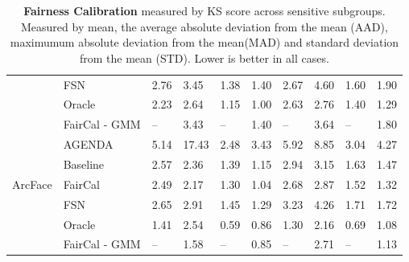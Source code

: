 \begin{table}
\begin{tabular}{l l ll ll ll ll}
& FSN          &    2.76 &   3.45  &    1.38 &  1.40  &    2.67 &   4.60  &    1.60 &  1.90  \\
& Oracle       &    2.23 &   2.64  &    1.15 &  1.00  &    2.63 &   2.76  &    1.40 &  1.29  \\
& FairCal - GMM &     -- &  3.43  &     -- &  1.40  &     -- &  3.64  &     -- &  1.80  \\
\hline
\multirow{5}{5em}{ArcFace} 
& AGENDA       &    5.14 &  17.43  &    2.48 &  3.43  &    5.92 &  8.85  &    3.04 &  4.27  \\
& Baseline     &    2.57 &   2.36  &    1.39 &  1.15  &    2.94 &  3.15  &    1.63 &  1.47  \\
& FairCal      &    2.49 &   2.17  &    1.30 &  1.04  &    2.68 &  2.87  &    1.52 &  1.32  \\
& FSN          &    2.65 &   2.91  &    1.45 &  1.29  &    3.23 &  4.26  &    1.71 &  1.72  \\
& Oracle       &    1.41 &   2.54  &    0.59 &  0.86  &    1.30 &  2.16  &    0.69 &  1.08  \\
& FairCal - GMM &     -- &  1.58  &     -- &  0.85  &     -- &  2.71  &     -- &  1.13  \\
\bottomrule
\end{tabular}
\caption{\textcolor{Bittersweet}{\textbf{Fairness Calibration}} measured by KS score across sensitive subgroups. Measured by mean, the average absolute deviation from the mean (AAD), maximumum absolute deviation from the mean(MAD) and standard deviation from the mean (STD). Lower is better in all cases.}
\label{tab:FairCalAp}
\end{table}

